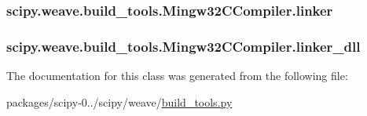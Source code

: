 \subsubsection[{linker}]{\setlength{\rightskip}{0pt plus 5cm}scipy.\+weave.\+build\+\_\+tools.\+Mingw32\+C\+Compiler.\+linker}\label{classscipy_1_1weave_1_1build__tools_1_1Mingw32CCompiler_a6dff9c1f40fc32ff02819f6b313f0f91}
\hypertarget{classscipy_1_1weave_1_1build__tools_1_1Mingw32CCompiler_a8b0d6030889b5179a6534915fa3e8366}{}
\subsubsection[{linker\+\_\+dll}]{\setlength{\rightskip}{0pt plus 5cm}scipy.\+weave.\+build\+\_\+tools.\+Mingw32\+C\+Compiler.\+linker\+\_\+dll}\label{classscipy_1_1weave_1_1build__tools_1_1Mingw32CCompiler_a8b0d6030889b5179a6534915fa3e8366}


The documentation for this class was generated from the following file\+:\begin{DoxyCompactItemize}
\item 
packages/scipy-\/0../scipy/weave/\hyperlink{build__tools_8py}{build\+\_\+tools.\+py}\end{DoxyCompactItemize}
